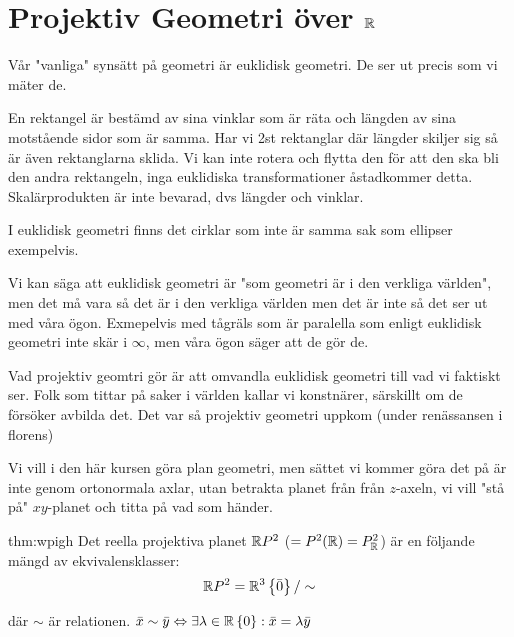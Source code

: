 \section{Projektiv Geometri över $\mathbb{R}$}\par
\noindent Vår "vanliga" synsätt på geometri är euklidisk geometri. De ser ut precis som vi mäter de.
\par\bigskip
\noindent En rektangel är bestämd av sina vinklar som är räta och längden av sina motstående sidor som är samma. Har vi 2st rektanglar där längder skiljer sig så är även rektanglarna sklida. Vi kan inte rotera och flytta den för att den ska bli den andra rektangeln, inga euklidiska transformationer åstadkommer detta. Skalärprodukten är inte bevarad, dvs längder och vinklar.
\par\bigskip
\noindent I euklidisk geometri finns det cirklar som inte är samma sak som ellipser exempelvis.
\par\bigskip
\noindent Vi kan säga att euklidisk geometri är "som geometri är i den verkliga världen", men det må vara så det är i den verkliga världen men det är inte så det ser ut med våra ögon. Exmepelvis med tågräls som är paralella som enligt euklidisk geometri inte skär i $\infty$, men våra ögon säger att de gör de.
\par\bigskip
\noindent Vad projektiv geomtri gör är att omvandla euklidisk geometri till vad vi faktiskt ser. Folk som tittar på saker i världen kallar vi konstnärer, särskillt om de försöker avbilda det. Det var så projektiv geometri uppkom (under renässansen i florens)
\par\bigskip
\noindent Vi vill i den här kursen göra plan geometri, men sättet vi kommer göra det på är inte genom ortonormala axlar, utan betrakta planet från från $z$-axeln, vi vill "stå på" $xy$-planet och titta på vad som händer.
\par\bigskip
\begin{theo}{thm:wpigh}
  Det reella projektiva planet $\mathbb{R} P^2$ ($= P^2(\mathbb{R}) = P_{\mathbb{R}}^2$) är en följande mängd av ekvivalensklasser:
  \begin{equation*}
    \begin{gathered}
      \mathbb{R} P^2 = \mathbb{R}^3\left\{\bar{0}\right\}/\sim
    \end{gathered}
  \end{equation*}\par
  \noindent där $\sim$ är relationen. $\bar{x}\sim\bar{y}\Leftrightarrow\exists\lambda\in\mathbb{R} \left\{0\right\}: \bar{x}=\lambda\bar{y}$
\end{theo}

